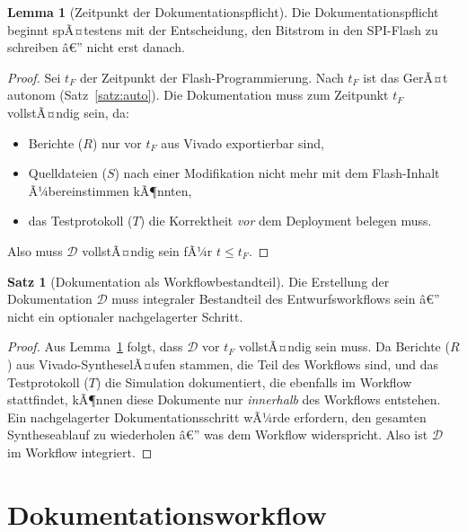 ﻿\documentclass[a4paper,12pt]{article}
\theoremstyle{definition}
\newtheorem{satz}{Satz}
\newtheorem{lemma}{Lemma}
\begin{document}
\begin{lemma}[Zeitpunkt der Dokumentationspflicht]
    \label{lem:zeitpunkt}
    Die Dokumentationspflicht beginnt spÃ¤testens mit der Entscheidung,
    den Bitstrom in den SPI-Flash zu schreiben â€” nicht erst danach.
\end{lemma}

\begin{proof}
    Sei $t_F$ der Zeitpunkt der Flash-Programmierung. Nach $t_F$ ist das
    GerÃ¤t autonom (Satz~\ref{satz:auto}). Die Dokumentation muss zum
    Zeitpunkt $t_F$ vollstÃ¤ndig sein, da:
    \begin{itemize}
        \item Berichte ($R$) nur vor $t_F$ aus Vivado exportierbar sind,
        \item Quelldateien ($S$) nach einer Modifikation nicht mehr mit
              dem Flash-Inhalt Ã¼bereinstimmen kÃ¶nnten,
        \item das Testprotokoll ($T$) die Korrektheit \emph{vor} dem
              Deployment belegen muss.
    \end{itemize}
    Also muss $\mathcal{D}$ vollstÃ¤ndig sein fÃ¼r $t \leq t_F$. \qedhere
\end{proof}

\begin{satz}[Dokumentation als Workflowbestandteil]
    \label{satz:workflow}
    Die Erstellung der Dokumentation $\mathcal{D}$ muss integraler
    Bestandteil des Entwurfsworkflows sein â€” nicht ein optionaler
    nachgelagerter Schritt.
\end{satz}

\begin{proof}
    Aus Lemma~\ref{lem:zeitpunkt} folgt, dass $\mathcal{D}$ vor $t_F$
    vollstÃ¤ndig sein muss. Da Berichte ($R$) aus Vivado-SyntheselÃ¤ufen
    stammen, die Teil des Workflows sind, und das Testprotokoll ($T$)
    die Simulation dokumentiert, die ebenfalls im Workflow stattfindet,
    kÃ¶nnen diese Dokumente nur \emph{innerhalb} des Workflows entstehen.
    Ein nachgelagerter Dokumentationsschritt wÃ¼rde erfordern, den gesamten
    Syntheseablauf zu wiederholen â€” was dem Workflow widerspricht.
    Also ist $\mathcal{D}$ im Workflow integriert. \qedhere
\end{proof}

\section{Dokumentationsworkflow}
\label{sec:workflow}
\end{document}
